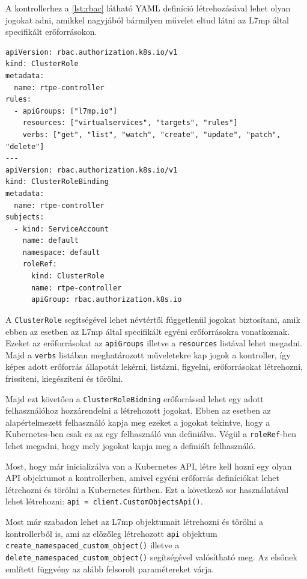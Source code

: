 A kontrollerhez a \ref{lst:rbac} látható YAML definíció létrehozásával lehet olyan jogokat
adni, amikkel nagyjából bármilyen művelet eltud látni az L7mp által specifikált 
erőforrásokon.

\begin{lstlisting}[caption=RBAC létrehozása, label=lst:rbac]
apiVersion: rbac.authorization.k8s.io/v1
kind: ClusterRole
metadata:
  name: rtpe-controller
rules:
  - apiGroups: ["l7mp.io"]
    resources: ["virtualservices", "targets", "rules"]
    verbs: ["get", "list", "watch", "create", "update", "patch", "delete"]
---
apiVersion: rbac.authorization.k8s.io/v1
kind: ClusterRoleBinding
metadata:
  name: rtpe-controller
subjects:
  - kind: ServiceAccount
    name: default
    namespace: default
    roleRef:
      kind: ClusterRole
      name: rtpe-controller
      apiGroup: rbac.authorization.k8s.io
\end{lstlisting}

A \texttt{ClusterRole} segítségével lehet névtértől függetlenül jogokat biztosítani,
amik ebben az esetben az L7mp által specifikált egyéni erőforrásokra vonatkoznak. 
Ezeket az erőforrásokat az \texttt{apiGroups} illetve a \texttt{resources} listával
lehet megadni. Majd a \texttt{verbs} listában meghatározott műveletekre kap 
jogok a kontroller, így képes adott erőforrás állapotát lekérni, listázni, figyelni,
erőforrásokat létrehozni, frissíteni, kiegészíteni és törölni. 

Majd ezt követően a \texttt{ClusterRoleBidning} erőforrással lehet egy adott
felhasználóhoz hozzárendelni a létrehozott jogokat. Ebben az esetben az alapértelmezett
felhasználó kapja meg ezeket a jogokat tekintve, hogy a Kubernetes-ben csak ez az egy
felhasználó van definiálva. Végül a \texttt{roleRef}-ben lehet megadni, hogy mely
jogokat kapja meg a definiált felhasználó. 

Most, hogy már inicializálva van a Kubernetes API, létre kell hozni egy olyan 
API objektumot a kontrollerben, amivel egyéni erőforrás definíciókat lehet létrehozni
és törölni a Kubernetes fürtben. Ezt a következő sor használatával lehet létrehozni: 
\texttt{api = client.CustomObjectsApi()}.

Most már szabadon lehet az L7mp objektumait létrehozni és törölni a kontrollerből is, 
ami az előzőleg létrehozott \texttt{api} objektum 
\texttt{create\_namespaced\_custom\_object()} illetve a 
\texttt{delete\_namespaced\_custom\_object()} segítségével valósítható meg. Az elsőnek 
említett függvény az alább felsorolt paramétereket várja.

